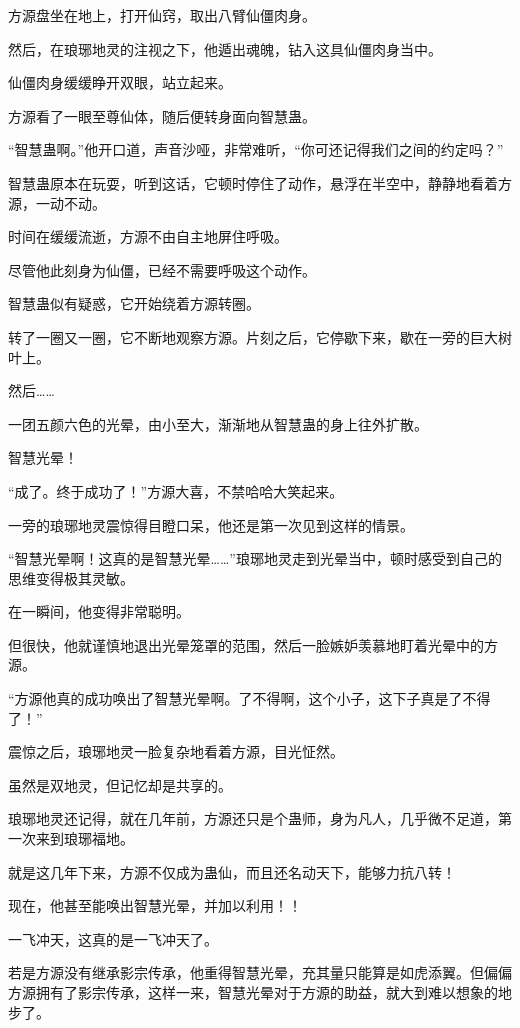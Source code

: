 
\begin{this_body}

方源盘坐在地上，打开仙窍，取出八臂仙僵肉身。

然后，在琅琊地灵的注视之下，他遁出魂魄，钻入这具仙僵肉身当中。

仙僵肉身缓缓睁开双眼，站立起来。

方源看了一眼至尊仙体，随后便转身面向智慧蛊。

“智慧蛊啊。”他开口道，声音沙哑，非常难听，“你可还记得我们之间的约定吗？”

智慧蛊原本在玩耍，听到这话，它顿时停住了动作，悬浮在半空中，静静地看着方源，一动不动。

时间在缓缓流逝，方源不由自主地屏住呼吸。

尽管他此刻身为仙僵，已经不需要呼吸这个动作。

智慧蛊似有疑惑，它开始绕着方源转圈。

转了一圈又一圈，它不断地观察方源。片刻之后，它停歇下来，歇在一旁的巨大树叶上。

然后……

一团五颜六色的光晕，由小至大，渐渐地从智慧蛊的身上往外扩散。

智慧光晕！

“成了。终于成功了！”方源大喜，不禁哈哈大笑起来。

一旁的琅琊地灵震惊得目瞪口呆，他还是第一次见到这样的情景。

“智慧光晕啊！这真的是智慧光晕……”琅琊地灵走到光晕当中，顿时感受到自己的思维变得极其灵敏。

在一瞬间，他变得非常聪明。

但很快，他就谨慎地退出光晕笼罩的范围，然后一脸嫉妒羡慕地盯着光晕中的方源。

“方源他真的成功唤出了智慧光晕啊。了不得啊，这个小子，这下子真是了不得了！”

震惊之后，琅琊地灵一脸复杂地看着方源，目光怔然。

虽然是双地灵，但记忆却是共享的。

琅琊地灵还记得，就在几年前，方源还只是个蛊师，身为凡人，几乎微不足道，第一次来到琅琊福地。

就是这几年下来，方源不仅成为蛊仙，而且还名动天下，能够力抗八转！

现在，他甚至能唤出智慧光晕，并加以利用！！

一飞冲天，这真的是一飞冲天了。

若是方源没有继承影宗传承，他重得智慧光晕，充其量只能算是如虎添翼。但偏偏方源拥有了影宗传承，这样一来，智慧光晕对于方源的助益，就大到难以想象的地步了。


\end{this_body}

